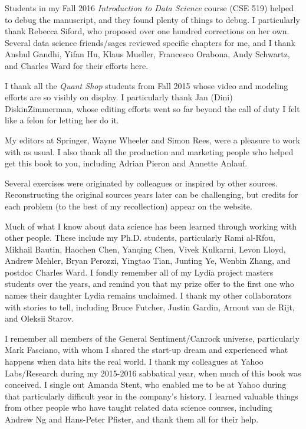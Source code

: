 \documentclass[10pt]{article}
\begin{document}
Students in my Fall 2016 \textit{Introduction to Data Science} course (CSE 519) helped to debug the manuscript, and they found plenty of things to debug. I particularly thank Rebecca Siford, who proposed over one hundred corrections on her own. Several data science friends/sages reviewed specific chapters for me, and I thank Anshul Gandhi, Yifan Hu, Klaus Mueller, Francesco Orabona, Andy Schwartz, and Charles Ward for their efforts here.

I thank all the \textit{Quant Shop} students from Fall 2015 whose video and modeling efforts are so visibly on display. I particularly thank Jan (Dini) DiskinZimmerman, whose editing efforts went so far beyond the call of duty I felt like a felon for letting her do it.

My editors at Springer, Wayne Wheeler and Simon Rees, were a pleasure to work with as usual. I also thank all the production and marketing people who helped get this book to you, including Adrian Pieron and Annette Anlauf.

Several exercises were originated by colleagues or inspired by other sources. Reconstructing the original sources years later can be challenging, but credits for each problem (to the best of my recollection) appear on the website.

Much of what I know about data science has been learned through working with other people. These include my Ph.D. students, particularly Rami al-Rfou, Mikhail Bautin, Haochen Chen, Yanqing Chen, Vivek Kulkarni, Levon Lloyd, Andrew Mehler, Bryan Perozzi, Yingtao Tian, Junting Ye, Wenbin Zhang, and postdoc Charles Ward. I fondly remember all of my Lydia project masters students over the years, and remind you that my prize offer to the first one who names their daughter Lydia remains unclaimed. I thank my other collaborators with stories to tell, including Bruce Futcher, Justin Gardin, Arnout van de Rijt, and Oleksii Starov.

I remember all members of the General Sentiment/Canrock universe, particularly Mark Fasciano, with whom I shared the start-up dream and experienced what happens when data hits the real world. I thank my colleagues at Yahoo Labs/Research during my 2015-2016 sabbatical year, when much of this book was conceived. I single out Amanda Stent, who enabled me to be at Yahoo during that particularly difficult year in the company's history. I learned valuable things from other people who have taught related data science courses, including Andrew Ng and Hans-Peter Pfister, and thank them all for their help.
\end{document}
